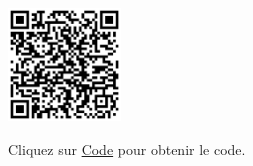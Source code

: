 \documentclass[a4paper,12pt]{report}
\begin{document}
\begin{minipage}{0.5\textwidth}
    \includegraphics[height=3cm]{Code TC309.png}
\end{minipage}%
\begin{minipage}{0.5\textwidth}
    Cliquez sur \href{https://github.com/DexterTaha/Controllino-PLC-Sample/blob/main/TC300/TC309_Chauffage_Maison/TC309_Chauffage_Maison.ino}{Code} pour obtenir le code.
\end{minipage}

\newpage
\end{document}

